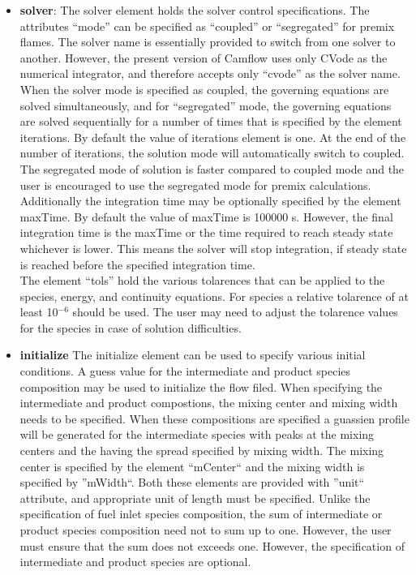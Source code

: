 \begin{itemize}
\item \textbf{solver}: The solver element holds the solver control specifications. The attributes ``mode'' can be specified as ``coupled'' or ``segregated'' for premix flames. The solver name is essentially provided to switch from one solver to another. However, the present version of Camflow uses only CVode as the numerical integrator, and therefore accepts only ``cvode'' as the solver name. When the solver mode is specified as coupled, the governing equations are solved simultaneously, and for ``segregated'' mode, the governing equations are solved sequentially for a number of times that is specified by the element iterations. By default the value of iterations element is one. At the end of the number of iterations, the solution mode will automatically switch to coupled. The segregated mode of solution is faster compared to coupled mode and the user is encouraged to use the segregated mode for premix calculations.\\

Additionally the integration time may be optionally specified by the element maxTime. By default the value of maxTime is 100000 s. However, the final integration time is the maxTime or the time required to reach steady state whichever is lower. This means the solver will stop integration, if steady state is reached before the specified integration time.\\

The element ``tols'' hold the various tolarences that can be applied to the species, energy, and continuity equations. For species a relative tolarence of at least 10$^{-6}$ should be used. The user may need to adjust the tolarence values for the species in case of solution difficulties.

\item \textbf{initialize} The initialize element can be used to specify various initial conditions. 
A guess value for the intermediate and product species composition may be used to initialize the flow filed. When specifying the intermediate and product compostions, the mixing center and mixing width needs to be specified. When these compositions are specified a guassien profile will be generated for the intermediate species with peaks at the mixing centers and the having the spread specified by mixing width. The mixing center is specified by the element ``mCenter`` and the mixing width is specified by ''mWidth``. Both these elements are provided with ''unit`` attribute, and appropriate unit of length must be specified. Unlike the specification of fuel inlet species composition, the sum of intermediate or product species composition need not to sum up to one. However, the user must ensure that the sum does not exceeds one. However, the specification of intermediate and product species are optional.\\


\end{itemize}
